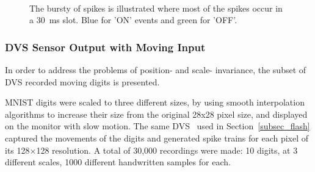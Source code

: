 	\begin{figure}[b!]
	  \centering
	  	  \\

	  \caption{The bursty of spikes is illustrated where most of the spikes occur in a 30~ms slot. Blue for 'ON' events and green for 'OFF'.}
	  \label{fig:flash}
	\end{figure}
	\subsubsection{DVS Sensor Output with Moving Input}
	In order to address the problems of position- and scale- invariance, the subset of DVS recorded moving digits is presented.
	
	MNIST digits were scaled to three different sizes, by using smooth interpolation algorithms to increase their size from the original 28x28 pixel size, and displayed on the monitor with slow motion. 
	The same DVS~\citep{serrano2013128} used in Section~\ref{subsec_flash} captured the movements of the digits and generated spike trains for each pixel of its 128$\times$128 resolution.
	A total of 30,000 recordings were made: 10 digits, at 3 different scales, 1000 different handwritten samples for each.
	